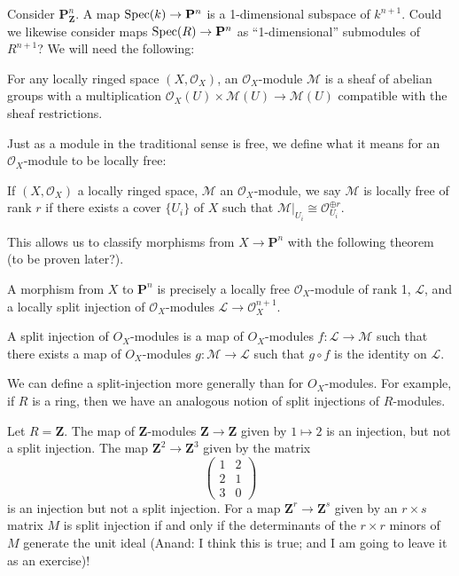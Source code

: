 Consider \(\mathbf{P}^n_\mathbf{Z}\). A map \(\operatorname{Spec} (k)\to \mathbf{P}^n\) is a 1-dimensional subspace of \(k^{n+1}\). Could we likewise consider maps \(\operatorname{Spec}(R)\to \mathbf{P}^n\) as ``1-dimensional'' submodules of \(R^{n+1}\)? We will need the following:
\begin{definition}
For any locally ringed space \((X,\mathcal{O}_X)\), an \(\mathcal{O}_X\)-module \(\mathcal{M}\) is a sheaf of abelian groups with a multiplication \(\mathcal{O}_X(U)\times \mathcal{M}(U)\to \mathcal{M}(U)\) compatible with the sheaf restrictions.
\end{definition}
Just as a module in the traditional sense is free, we define what it means for an \(\mathcal{O}_X\)-module to be locally free:
\begin{definition}
If \((X,\mathcal{O}_X)\) a locally ringed space, \(\mathcal{M}\) an \(\mathcal{O}_X\)-module, we say \(\mathcal{M}\) is locally free of rank \(r\) if there exists a cover \(\{U_i\}\) of \(X\) such that \(\mathcal{M}|_{U_i} \cong \mathcal{O}_{U_i}^{\oplus r}\). 
\end{definition}
This allows us to classify morphisms from \(X\to \mathbf{P}^n\) with the following theorem (to be proven later?).
\begin{theorem}
    A morphism from \(X\) to \(\mathbf{P}^n\) is precisely a locally free \(\mathcal{O}_X\)-module of rank 1, \(\mathcal{L}\), and a locally split injection of \(\mathcal{O}_X\)-modules \(\mathcal{L}\to\mathcal{O}^{n+1}_X\). 
\end{theorem}
\begin{definition}
A split injection of \(O_X\)-modules is a map of \(O_X\)-modules \(f: \mathcal{L} \to \mathcal{M}\) such that there exists a map of \(O_X\)-modules \(g: \mathcal{M} \to \mathcal{L}\) such that \(g\circ f\) is the identity on \(\mathcal{L}\).
\end{definition}
We can define a split-injection more generally than for \(O_X\)-modules.
For example, if \(R\) is a ring, then we have an analogous notion of split injections of \(R\)-modules.
\begin{example}
  Let \(R = \mathbf{Z}\).
  The map of \(\mathbf{Z}\)-modules \(\mathbf{Z} \to \mathbf{Z}\) given by \(1 \mapsto 2\) is an injection, but not a split injection.
  The map \(\mathbf{Z}^2 \to \mathbf{Z}^3\) given by the matrix
  \[ \begin{pmatrix}
    1 & 2 \\
    2 & 1 \\
    3 & 0
   \end{pmatrix}
 \] is an injection but not a split injection.
 For a map \(\mathbf{Z}^r \to \mathbf{Z}^s\) given by an \(r \times s\) matrix \(M\) is split injection if and only if the determinants of the \(r \times r\) minors of \(M\) generate the unit ideal (Anand: I think this is true; and I am going to leave it as an exercise)!
\end{example}


